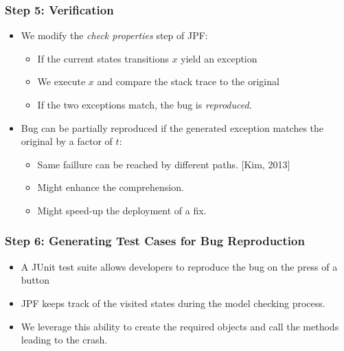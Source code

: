 \documentclass{beamer}
\begin{document}
\begin{frame}
\frametitle{Step 5: Verification}

\begin{itemize}

\item We modify the \textit{check properties} step of JPF:

\begin{itemize}
\item If the current states transitions $x$ yield an exception
\item We execute $x$ and compare the stack trace to the original
\item If the two exceptions match, the bug is \textit{reproduced}.
\end{itemize}

\vspace{0.3cm}

\item Bug can be partially reproduced if the generated exception matches the original by a factor of $t$:

\begin{itemize}
\item Same faillure can be reached by different paths. [Kim, 2013]
\item Might enhance the comprehension.
\item Might speed-up the deployment of a fix.
\end{itemize}

\end{itemize}

\end{frame}


\begin{frame}
\frametitle{Step 6: Generating Test Cases for Bug Reproduction}

\begin{itemize}
\item A JUnit test suite allows developers to reproduce the bug on the press of a button
\vspace{0.3cm}
\item JPF keeps track of the visited states during the model checking process.
\vspace{0.3cm}
\item We leverage this ability to create the required objects and call the methods leading to the crash.
\end{itemize}



\end{frame}
\end{document}
